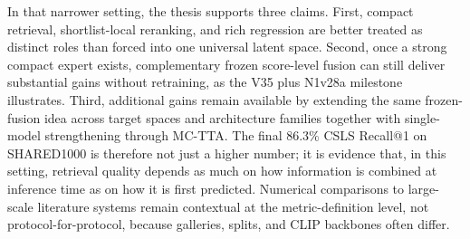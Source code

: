 In that narrower setting, the thesis supports three claims. First, compact retrieval, shortlist-local reranking, and rich regression are better treated as distinct roles than forced into one universal latent space. Second, once a strong compact expert exists, complementary frozen score-level fusion can still deliver substantial gains without retraining, as the V35 plus N1v28a milestone illustrates. Third, additional gains remain available by extending the same frozen-fusion idea across target spaces and architecture families together with single-model strengthening through MC-TTA. The final $86.3\%$ CSLS Recall@1 on SHARED1000 is therefore not just a higher number; it is evidence that, in this setting, retrieval quality depends as much on how information is combined at inference time as on how it is first predicted. Numerical comparisons to large-scale literature systems remain contextual at the metric-definition level, not protocol-for-protocol, because galleries, splits, and CLIP backbones often differ.

